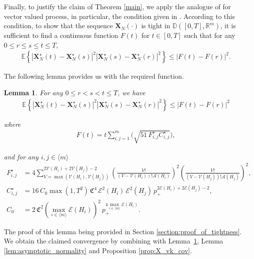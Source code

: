 \documentclass[11pt,reqno]{amsart}
\numberwithin{equation}{section}
\newcommand{\abs}[1]{\left\lvert #1 \right\rvert}
\newcommand{\sprod}[1]{\langle#1\rangle}
\newcommand{\E}[1]{\mathbb{E}\left\{ #1\right\}}
\newcommand{\R}{\mathbb{R}}
\newtheorem{lem}[theo]{Lemma}
\newcommand{\nelem}[1]{{Lemma \ref{#1}}}
\newcommand{\neprop}[1]{{Proposition \ref{#1}}}
\newcommand{\netheo}[1]{{Theorem \ref{#1}}}
\newcommand{\kb}[1]{\boldsymbol{#1}}
\newcommand{\vk}[1]{\kb{#1}}
\begin{document}
Finally, to justify the claim of \netheo{main}, we apply the analogue of \cite[Theorem 13.5]{billingsley2013convergence} for vector valued process, in particular, the condition given in \cite[Eqn.\ (13.14)]{billingsley2013convergence}. According to this condition, {to show that the sequence {$\vk X_N(\cdot)$} is tight in $\mathbb{D}([0,T],\R^{m})$}, it is sufficient to find a continuous function $F(t)$ {for $t\in[0,T]$} such that for any {$0\leqslant r\leqslant s\leqslant t\leqslant T$,} 
\begin{align*}
    \E{\abs{\vk X^{\star}_N(t)-\vk X^{\star}_N(s)}^2\abs{\vk X^{\star}_N(s)-\vk  X^{\star}_N(r)}^2}\leqslant \abs{F(t)-F(r)}^2.
\end{align*}

The following lemma provides us with the required function.
    
\begin{lem}\label{lem:tightness} For any $0\leqslant r<s<t\leqslant T$, we have
    \begin{align}
        \E{\abs{\vk X^{\star}_N(t)-\vk X^{\star}_N(s)}^2\abs{\vk X^{\star}_N(s)-\vk 
        X^{\star}_N(r)}^2}\leqslant \abs{F(t)-F(r)}^2\label{tightness_claim}
    \end{align}

    where 
    \begin{align*}
        F(t) = t\sum_{i,j=1}^{m}\biggl(\sqrt{51\,F_{i,j}^{\star}C_{i,j}^{\star}}\biggr),
    \end{align*}

    and for any $i,j\in\sprod{m}$
    \begin{align}
        F_{i,j}^{\star} &=4{\sum_{V=\max(\mathcal{V}(H_i),\mathcal{V}(H_j))}^{2\mathcal{V}(H_i) + 2\mathcal{V}(H_j) - 2}}\left(\frac{V!}{(V-\mathcal{V}({H}_i))!\mathcal{A}({H}_i)}\right)^2\left(\frac{V!}{(V-\mathcal{V}({H}_j))!\mathcal{A}({H}_j)}\right)^2,\label{frak_f_def}\\
        C_{i,j}^{\star} &= 16\,C_0\max(1,T^2)\,{\mathfrak{C}^4}\,\mathcal{E}^2({H}_i)\,\mathcal{E}^2({H}_j)\,p_+^{2\mathcal{E}({H}_i)+2\mathcal{E}({H}_j)-2},\label{frak_c_def}\\
        C_0 &= 2\,{\mathfrak{C}^2} \left(\max_{i\in\sprod{m}}\mathcal{E}({H}_i)\right)^2\,{p_+^{4\max_{i\in\sprod{m}}\mathcal{E}({H}_i)}}.\label{C_0_def}
    \end{align}
\end{lem}

The proof of this lemma being provided in Section \ref{section:proof_of_tightness}. {We} obtain the claimed convergence by combining \cite[Theorem 13.5]{billingsley2013convergence} with Lemma~\ref{lem:tightness}, \nelem{lem:asymptotic_normality} and \neprop{prop:X_vk_cov}.
\end{document}
